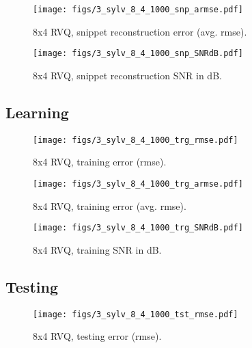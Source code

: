 								\begin{figure}[h!]
								\centering
								\texttt{[image: figs/3\_sylv\_8\_4\_1000\_snp\_armse.pdf]}
								\caption{8x4 RVQ, snippet reconstruction error (avg. rmse).}
								\label{fig:3_sylv_8_4_1000_snp_armse}
								\end{figure}

								\begin{figure}[h!]
								\centering
								\texttt{[image: figs/3\_sylv\_8\_4\_1000\_snp\_SNRdB.pdf]}
								\caption{8x4 RVQ, snippet reconstruction SNR in dB.}
								\label{fig:3_sylv_8_4_1000_snp_SNRdB}
								\end{figure}
\clearpage
\newpage
\subsection{Learning}

								\begin{figure}[h!]
								\centering
								\texttt{[image: figs/3\_sylv\_8\_4\_1000\_trg\_rmse.pdf]}
								\caption{8x4 RVQ, training error (rmse).}
								\label{fig:3_sylv_8_4_1000_trg_rmse}
								\end{figure}


								\begin{figure}[h!]
								\centering
								\texttt{[image: figs/3\_sylv\_8\_4\_1000\_trg\_armse.pdf]}
								\caption{8x4 RVQ, training error (avg. rmse).}
								\label{fig:3_sylv_8_4_1000_trg_armse}
								\end{figure}

								\begin{figure}[h!]
								\centering
								\texttt{[image: figs/3\_sylv\_8\_4\_1000\_trg\_SNRdB.pdf]}
								\caption{8x4 RVQ, training SNR in dB.}
								\label{fig:3_sylv_8_4_1000_trg_SNRdB}
								\end{figure}
\clearpage
\newpage
\subsection{Testing}
								\begin{figure}[h!]
								\centering
								\texttt{[image: figs/3\_sylv\_8\_4\_1000\_tst\_rmse.pdf]}
								\caption{8x4 RVQ, testing error (rmse).}
								\label{fig:3_sylv_8_4_1000_tst_rmse}
								\end{figure}


